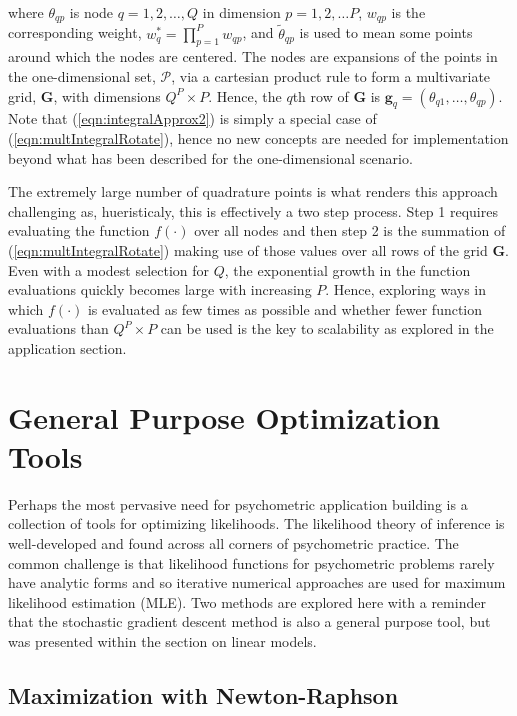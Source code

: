 \documentclass[12pt]{article}
\begin{document}
\noindent where $\theta_{qp}$ is node $q = 1, 2, \ldots, Q$ in dimension $p = 1,2, \ldots P$, $w_{qp}$ is the corresponding weight, $w_q^* = \prod^P_{p=1}w_{qp}$, and $\widetilde{\theta}_{qp}$ is used to mean some points around which the nodes are centered. The nodes are expansions of the points in the one-dimensional set, $\mathcal{P}$, via a cartesian product rule to form a multivariate grid, $\bm{G}$, with dimensions $Q^P\times P$. Hence, the $q$th row of $\bm{G}$ is $\bm{g}_q = (\theta_{q1}, \ldots, \theta_{qp})$.  Note that (\ref{eqn:integralApprox2}) is simply a special case of (\ref{eqn:multIntegralRotate}), hence no new concepts are needed for implementation beyond what has been described for the one-dimensional scenario. 

The extremely large number of quadrature points is what renders this approach challenging as, hueristicaly, this is effectively a two step process. Step 1 requires evaluating the function $f(\cdot)$ over all nodes and then step 2 is the summation of (\ref{eqn:multIntegralRotate}) making use of those values over all rows of the grid $\bm{G}$. Even with a modest selection for $Q$, the exponential growth in the function evaluations quickly becomes large with increasing $P$. Hence, exploring ways in which $f(\cdot)$ is evaluated as few times as possible and whether fewer function evaluations than $Q^P\times P$ can be used is the key to scalability as explored in the application section. 

\section*{General Purpose Optimization Tools}

Perhaps the most pervasive need for psychometric application building is a collection of tools for optimizing likelihoods. The likelihood theory of inference is well-developed \cite{king:1998} and found across all corners of psychometric practice. The common challenge is that likelihood functions for psychometric problems rarely have analytic forms and so iterative numerical approaches are used for maximum likelihood estimation (MLE). Two methods are explored here with a reminder that the stochastic gradient descent method is also a general purpose tool, but was presented within the section on linear models.

\subsection*{Maximization with Newton-Raphson}
\end{document}
